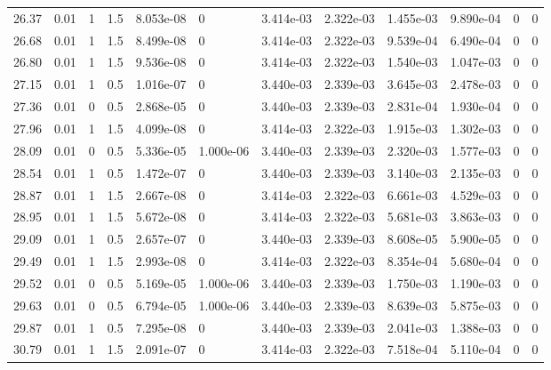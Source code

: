 \documentclass[preview]{standalone}
\begin{document}
{{{\begin{tabular}{L{1.2cm}C{1.2cm} C{0.3cm}C{0.5cm} C{1.4cm}C{1.4cm} C{1.4cm}C{1.4cm} C{1.6cm}C{1.6cm} C{1.6cm}C{1.6cm}}
  26.37  &  0.01  & 1     & 1.5 &  8.053e-08  & 0  &  3.414e-03&   2.322e-03& 1.455e-03 & 9.890e-04   &  0 & 0  \\ 
  26.68  &  0.01  & 1     & 1.5 &  8.499e-08  & 0  &  3.414e-03&   2.322e-03& 9.539e-04 & 6.490e-04   &  0 & 0  \\ 
  26.80  &  0.01  & 1     & 1.5 &  9.536e-08  & 0  &  3.414e-03&   2.322e-03& 1.540e-03 & 1.047e-03   &  0 & 0  \\ 
  27.15  &  0.01  & 1     & 0.5 &  1.016e-07  & 0  &  3.440e-03&   2.339e-03& 3.645e-03 & 2.478e-03   &  0 & 0  \\ 
  27.36  &  0.01  & 0     & 0.5 &  2.868e-05  & 0  &  3.440e-03&   2.339e-03& 2.831e-04 & 1.930e-04   &  0 & 0  \\ 
  27.96  &  0.01  & 1     & 1.5 &  4.099e-08  & 0  &  3.414e-03&   2.322e-03& 1.915e-03 & 1.302e-03   &  0 & 0  \\ 
  28.09  &  0.01  & 0     & 0.5 &  5.336e-05  & 1.000e-06  &  3.440e-03&   2.339e-03& 2.320e-03 & 1.577e-03   &  0 & 0  \\ 
  28.54  &  0.01  & 1     & 0.5 &  1.472e-07  & 0  &  3.440e-03&   2.339e-03& 3.140e-03 & 2.135e-03   &  0 & 0  \\ 
  28.87  &  0.01  & 1     & 1.5 &  2.667e-08  & 0  &  3.414e-03&   2.322e-03& 6.661e-03 & 4.529e-03   &  0 & 0  \\ 
  28.95  &  0.01  & 1     & 1.5 &  5.672e-08  & 0  &  3.414e-03&   2.322e-03& 5.681e-03 & 3.863e-03   &  0 & 0  \\ 
  29.09  &  0.01  & 1     & 0.5 &  2.657e-07  & 0  &  3.440e-03&   2.339e-03& 8.608e-05 & 5.900e-05   &  0 & 0  \\ 
  29.49  &  0.01  & 1     & 1.5 &  2.993e-08  & 0  &  3.414e-03&   2.322e-03& 8.354e-04 & 5.680e-04   &  0 & 0  \\ 
  29.52  &  0.01  & 0     & 0.5 &  5.169e-05  & 1.000e-06  &  3.440e-03&   2.339e-03& 1.750e-03 & 1.190e-03   &  0 & 0  \\ 
  29.63  &  0.01  & 0     & 0.5 &  6.794e-05  & 1.000e-06  &  3.440e-03&   2.339e-03& 8.639e-03 & 5.875e-03   &  0 & 0  \\ 
  29.87  &  0.01  & 1     & 0.5 &  7.295e-08  & 0  &  3.440e-03&   2.339e-03& 2.041e-03 & 1.388e-03   &  0 & 0  \\ 
  30.79  &  0.01  & 1     & 1.5 &  2.091e-07  & 0  &  3.414e-03&   2.322e-03& 7.518e-04 & 5.110e-04   &  0 & 0  \\ 
\hline 
\end{tabular} 

}}}
\end{document}
